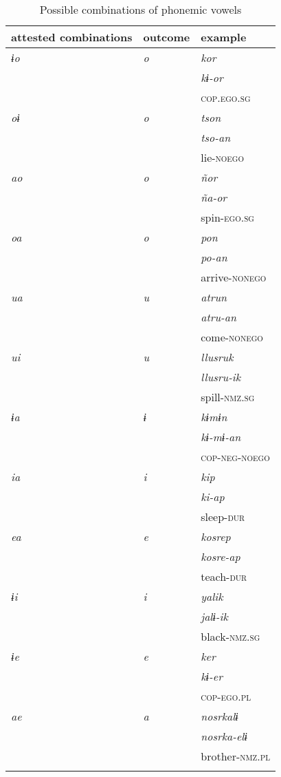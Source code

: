 \documentclass[output=paper]{langsci/langscibook}
\begin{document}
\begin{table}
\begin{tabularx}{\textwidth}{XXX}
\lsptoprule
attested combinations & outcome & example\\
\midrule
\textit{ɨo} & \textit{o} & \textit{kor}\\
& & \textit{kɨ-or}\\
& & \textsc{cop.ego.sg}\\
\hline
\textit{oɨ} & \textit{o} & \textit{tson}\\
& & \textit{tso-an}\\
& & lie-\textsc{noego}\\
\hline
\textit{ao} & \textit{o} & \textit{ñor}\\
& & \textit{ña-or}\\
& & spin-\textsc{ego.sg}\\
\hline 
\textit{oa} & \textit{o} & \textit{pon}\\
& & \textit{po-an}\\
& & arrive-\textsc{nonego}\\
\hline
\textit{ua} & \textit{u} & \textit{atrun}\\
& & \textit{atru-an}\\
& & come-\textsc{nonego}\\
\hline
\textit{ui} & \textit{u} & \textit{llusruk}\\
& & \textit{llusru-ik}\\
& & spill-\textsc{nmz.sg}\\
\hline
\textit{ɨa} & \textit{ɨ} & \textit{kɨmɨn}\\
& & \textit{kɨ-mɨ-an}\\
& & \textsc{cop-neg-noego}\\
\hline
\textit{ia} & \textit{i} & \textit{kip}\\
& & \textit{ki-ap}\\
& & sleep-\textsc{dur}\\
\hline
\textit{ea} & \textit{e} & \textit{kosrep}\\
& & \textit{kosre-ap}\\
& & teach-\textsc{dur}\\
\hline
\textit{ɨi} & \textit{i} & \textit{yalik}\\
& & \textit{jalɨ-ik}\\
& & black-\textsc{nmz.sg}\\
\hline
\textit{ɨe} & \textit{e} & \textit{ker}\\
& & \textit{kɨ-er}\\
& & \textsc{cop-ego.pl}\\
\hline
\textit{ae} & \textit{a} & \textit{nosrkalɨ}\\
& & \textit{nosrka-elɨ}\\
& & brother-\textsc{nmz.pl}\\
\lspbottomrule
\end{tabularx}
\caption{Possible combinations of phonemic vowels}
\label{tab:gg4}
\end{table}
\end{document}

